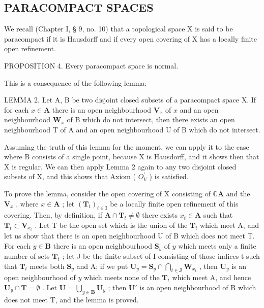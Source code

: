 \subsection{PARACOMPACT SPACES}

We recall (Chapter I, § 9, no. 10) that a topological space X is said to be paracompact if it is Hausdorff and if every open covering of X has a locally finite open refinement.

PROPOSITION 4. Every paracompact space is normal.

This is a consequence of the following lemma:

LEMMA 2. Let A, B be two disjoint closed subsets of a paracompact space X. If for each \(x \in \mathbf{A}\) there is an open neighbourhood \(\mathbf{V}_x\) of \(x\) and an open neighbourhood \(\mathbf{W}_x\) of B which do not intersect, then there exists an open neighbourhood T of A and an open neighbourhood U of B which do not intersect.

Assuming the truth of this lemma for the moment, we can apply it to the case where B consists of a single point, because X is Hausdorff, and it shows then that X is regular. We can then apply Lemma 2 again to any two disjoint closed subsets of X, and this shows that Axiom ( \(O_{V}^{\prime}\) ) is satisfied.

To prove the lemma, consider the open covering of X consisting of \(\mathbb{C}\mathbf{A}\) and the \(\mathbf{V}_x\) , where \(x \in \mathbf{A}\) ; let \((\mathbf{T}_t)_{t \in \mathbf{I}}\) be a locally finite open refinement of this covering. Then, by definition, if \(\mathbf{A} \cap \mathbf{T}_t \neq \emptyset\) there exists \(x_t \in \mathbf{A}\) such that \(\mathbf{T}_t \subset \mathbf{V}_{x_t}\) . Let T be the open set which is the union of the \(\mathbf{T}_t\) which meet A, and let us show that there is an open neighbourhood U of B which does not meet T. For each \(y \in \mathbf{B}\) there is an open neighbourhood \(\mathbf{S}_y\) of \(y\) which meets only a finite number of sets \(\mathbf{T}_t\) ; let J be the finite subset of I consisting of those indices t such that \(\mathbf{T}_t\) meets both \(\mathbf{S}_y\) and A; if we put \(\mathbf{U}_y = \mathbf{S}_y \cap \bigcap_{t \in \mathbf{J}} \mathbf{W}_{x_t}\) , then \(\mathbf{U}_y\) is an open neighbourhood of \(y\) which meets none of the \(\mathbf{T}_t\) which meet A, and hence \(\mathbf{U}_y \cap \mathbf{T} = \emptyset\) . Let \(\mathbf{U} = \bigcup_{y \in \mathbf{B}} \mathbf{U}_y\) ; then \(\mathbf{U}'\) is an open neighbourhood of B which does not meet T, and the lemma is proved.

